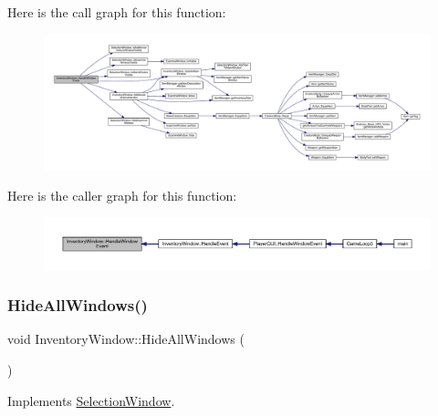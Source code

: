 Here is the call graph for this function\+:
\nopagebreak
\begin{figure}[H]
\begin{center}
\leavevmode
\includegraphics[width=350pt]{d1/dee/class_inventory_window_a201c5b514200d4b3afc27fa056c1c365_cgraph}
\end{center}
\end{figure}
Here is the caller graph for this function\+:
\nopagebreak
\begin{figure}[H]
\begin{center}
\leavevmode
\includegraphics[width=350pt]{d1/dee/class_inventory_window_a201c5b514200d4b3afc27fa056c1c365_icgraph}
\end{center}
\end{figure}
\mbox{\label{class_inventory_window_aef14cbe5f17a626c01df9948aac71259}} 
\subsubsection{\texorpdfstring{Hide\+All\+Windows()}{HideAllWindows()}}
{\footnotesize\ttfamily void Inventory\+Window\+::\+Hide\+All\+Windows (\begin{DoxyParamCaption}{ }\end{DoxyParamCaption})\hspace{0.3cm}{\ttfamily [virtual]}}



Implements \mbox{\hyperlink{class_selection_window_a1d0561e5fbd751025c71484589f83841}{Selection\+Window}}.

